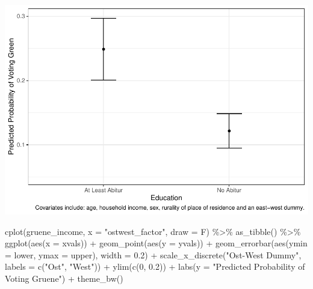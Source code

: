 \documentclass[
]{article}
\newenvironment{Shaded}{\begin{snugshade}}{\end{snugshade}}
\newcommand{\AttributeTok}[1]{\textcolor[rgb]{0.77,0.63,0.00}{#1}}
\newcommand{\DecValTok}[1]{\textcolor[rgb]{0.00,0.00,0.81}{#1}}
\newcommand{\FloatTok}[1]{\textcolor[rgb]{0.00,0.00,0.81}{#1}}
\newcommand{\FunctionTok}[1]{\textcolor[rgb]{0.00,0.00,0.00}{#1}}
\newcommand{\NormalTok}[1]{#1}
\newcommand{\SpecialCharTok}[1]{\textcolor[rgb]{0.00,0.00,0.00}{#1}}
\newcommand{\StringTok}[1]{\textcolor[rgb]{0.31,0.60,0.02}{#1}}
\begin{document}
\includegraphics{AVCD_Final_Assignment-Edenhofer_files/figure-latex/gruene-education-1.pdf}

\begin{Shaded}
\begin{Highlighting}[]
\FunctionTok{cplot}\NormalTok{(gruene\_income, }\AttributeTok{x =} \StringTok{"ostwest\_factor"}\NormalTok{, }\AttributeTok{draw =}\NormalTok{ F) }\SpecialCharTok{\%\textgreater{}\%}
  \FunctionTok{as\_tibble}\NormalTok{() }\SpecialCharTok{\%\textgreater{}\%}
  \FunctionTok{ggplot}\NormalTok{(}\FunctionTok{aes}\NormalTok{(}\AttributeTok{x =}\NormalTok{ xvals)) }\SpecialCharTok{+}
  \FunctionTok{geom\_point}\NormalTok{(}\FunctionTok{aes}\NormalTok{(}\AttributeTok{y =}\NormalTok{ yvals)) }\SpecialCharTok{+}
  \FunctionTok{geom\_errorbar}\NormalTok{(}\FunctionTok{aes}\NormalTok{(}\AttributeTok{ymin =}\NormalTok{ lower, }\AttributeTok{ymax =}\NormalTok{ upper), }\AttributeTok{width =} \FloatTok{0.2}\NormalTok{) }\SpecialCharTok{+}
  \FunctionTok{scale\_x\_discrete}\NormalTok{(}\StringTok{"Ost{-}West Dummy"}\NormalTok{, }\AttributeTok{labels =} \FunctionTok{c}\NormalTok{(}\StringTok{"Ost"}\NormalTok{, }\StringTok{"West"}\NormalTok{)) }\SpecialCharTok{+}
  \FunctionTok{ylim}\NormalTok{(}\FunctionTok{c}\NormalTok{(}\DecValTok{0}\NormalTok{, }\FloatTok{0.2}\NormalTok{)) }\SpecialCharTok{+}
  \FunctionTok{labs}\NormalTok{(}\AttributeTok{y =} \StringTok{"Predicted Probability of Voting Gruene"}\NormalTok{) }\SpecialCharTok{+}
  \FunctionTok{theme\_bw}\NormalTok{()}
\end{Highlighting}
\end{Shaded}
\end{document}
